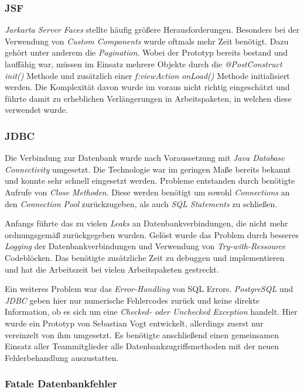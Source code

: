 \subsubsection{JSF}

\emph{Jarkarta Server Faces} stellte häufig größere Herausforderungen. Besonders bei der Verwendung von \emph{Custom Components} wurde oftmals mehr Zeit benötigt. Dazu gehört unter anderem die \emph{Pagination}. Wobei der Prototyp bereits bestand und lauffähig war, müssen im Einsatz mehrere Objekte durch die \emph{@PostConstruct init()} Methode und zusätzlich einer \emph{f:viewAction onLoad()} Methode initialisiert werden.
Die Komplexität davon wurde im voraus nicht richtig eingeschätzt und führte damit zu erheblichen Verlängerungen in Arbeitspaketen, in welchen diese verwendet wurde.

\subsubsection{JDBC}

Die Verbindung zur Datenbank wurde nach Voraussetzung mit \emph{Java Database Connectivity} umgesetzt. Die Technologie war im geringen Maße bereits bekannt und konnte sehr schnell eingesetzt werden. Probleme entstanden durch benötigte Aufrufe von \emph{Close Methoden}. Diese werden benötigt um sowohl \emph{Connections} an den \emph{Connection Pool} zurückzugeben, als auch \emph{SQL Statements} zu schließen.

Anfangs führte das zu vielen \emph{Leaks} an Datenbankverbindungen, die nicht mehr ordnungsgemäß zurückgegeben wurden. Gelöst wurde das Problem durch besseres \emph{Logging} der Datenbankverbindungen und Verwendung von \emph{Try-with-Ressource} Codeblöcken. Das benötigte zusätzliche Zeit zu debuggen und implementieren und hat die Arbeitszeit bei vielen Arbeitspaketen gestreckt.\newline

Ein weiteres Problem war das \emph{Error-Handling} von SQL Errors. \emph{PostgreSQL} und \emph{JDBC} geben hier nur numerische Fehlercodes zurück und keine direkte Information, ob es sich um eine \emph{Checked- oder Unchecked Exception} handelt. Hier wurde ein Prototyp von Sebastian Vogt entwickelt, allerdings zuerst nur vereinzelt von ihm umgesetzt. Es benötigte anschließend einen gemeinsamen Einsatz aller Teammitglieder alle Datenbankzugriffsmethoden mit der neuen Fehlerbehandlung auszustatten.

\subsubsection{Fatale Datenbankfehler}

